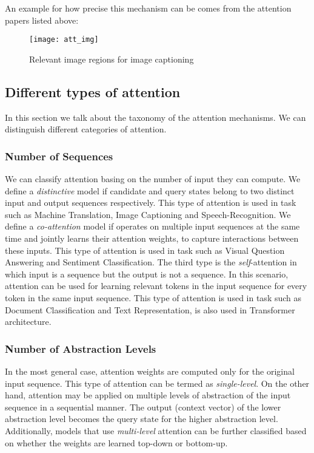 \documentclass[11pt]{article}
\begin{document}
An example for how precise this mechanism can be comes from the attention papers listed above:

\begin{figure}[h]
\centerline{\texttt{[image: att\_img]}}
\caption{Relevant image regions for image captioning}
\label{fig}
\end{figure}


\subsection{Different types of attention}
In this section we talk about the taxonomy of the attention mechanisms. We can distinguish different categories of attention.  

\subsubsection{Number of Sequences}
We can classify attention basing on the number of input they can compute. We define a \emph{distinctive} model if candidate and query states belong to two distinct input and output sequences respectively. This type of attention is used in task such as Machine Translation, Image Captioning and Speech-Recognition. We define a \emph{co-attention} model if operates on multiple input sequences at the same time and jointly learns their attention weights, to capture interactions between these inputs. This type of attention is used in task such as Visual Question Answering and Sentiment Classification. The third type is the \emph{self}-attention in which input is a sequence but the output is not a sequence. In this scenario, attention can be used for learning relevant tokens in the input sequence for every token in the same input sequence. This type of attention is used in task such as Document Classification and Text Representation, is also used in Transformer architecture.

\subsubsection{Number of Abstraction Levels}
In the most general case, attention weights are computed only for the original input sequence. This type of attention can be termed as \emph{single-level}. On the other hand, attention may be applied on multiple levels of abstraction of the input sequence in a sequential manner. The output (context vector) of the lower abstraction level becomes the query state for the higher abstraction level. Additionally, models that use \emph{multi-level} attention can be further classified based on whether the weights are learned top-down or bottom-up.
\end{document}
